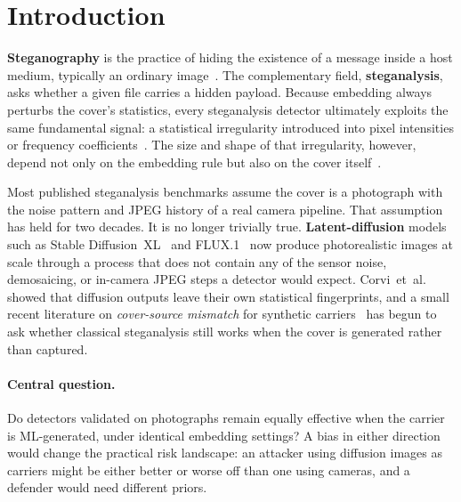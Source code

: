 \documentclass[10pt,twocolumn,a4paper]{article}
\begin{document}
\section{Introduction}
\label{sec:intro}

\textbf{Steganography} is the practice of hiding the existence of a message inside a host medium, typically an ordinary image~\cite{petitcolas1999,cheddad2010}. The complementary field, \textbf{steganalysis}, asks whether a given file carries a hidden payload. Because embedding always perturbs the cover's statistics, every steganalysis detector ultimately exploits the same fundamental signal: a statistical irregularity introduced into pixel intensities or frequency coefficients~\cite{westfeld1999chi,fridrich2001lsb,dumitrescu2003sp}. The size and shape of that irregularity, however, depend not only on the embedding rule but also on the cover itself~\cite{giboulot2020csm,mallet2024csm}.

Most published steganalysis benchmarks assume the cover is a photograph with the noise pattern and JPEG history of a real camera pipeline. That assumption has held for two decades. It is no longer trivially true. \textbf{Latent-diffusion} models such as Stable Diffusion~XL~\cite{sdxl2023} and FLUX.1~\cite{flux2024} now produce photorealistic images at scale through a process that does not contain any of the sensor noise, demosaicing, or in-camera JPEG steps a detector would expect. Corvi~et~al.~\cite{corvi2023diffusion} showed that diffusion outputs leave their own statistical fingerprints, and a small recent literature on \emph{cover-source mismatch} for synthetic carriers~\cite{mereur2024deepfake,mallet2024csm} has begun to ask whether classical steganalysis still works when the cover is generated rather than captured.

\paragraph{Central question.} Do detectors validated on photographs remain equally effective when the carrier is ML-generated, under identical embedding settings? A bias in either direction would change the practical risk landscape: an attacker using diffusion images as carriers might be either better or worse off than one using cameras, and a defender would need different priors.
\end{document}
